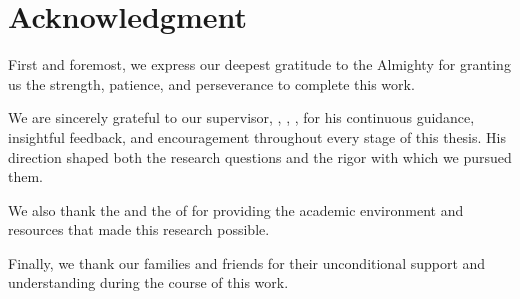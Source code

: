 \chapter*{Acknowledgment}

First and foremost, we express our deepest gratitude to the Almighty for granting
us the strength, patience, and perseverance to complete this work.

We are sincerely grateful to our supervisor, \textbf{\supervisorname},
\supervisordept, \university, for his continuous guidance, insightful feedback,
and encouragement throughout every stage of this thesis. His direction shaped
both the research questions and the rigor with which we pursued them.

We also thank the \department{} and the \faculty{} of \university{} for providing
the academic environment and resources that made this research possible.

Finally, we thank our families and friends for their unconditional support and
understanding during the course of this work.

\clearpage
